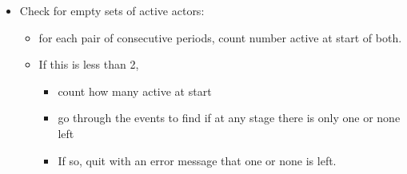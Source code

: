 \documentclass[12pt,a4paper]{article}
\renewcommand{\=}{\,=\,}
\newcommand{\+}{\,+\,}
\begin{document}
\begin{description}
\begin{itemize}
\begin{algorithmic}
\ENDIF
\ENDFOR
\ENDFOR
\ENDFOR
\end{algorithmic}
\item
Check for empty sets of active actors:
\begin{itemize}
\item for each pair of consecutive periods, count number active at start of
  both.
\item If this is less than 2,
\begin{itemize}
\item count how many active at start
\item go through the events to find if at any stage there is only one or
  none left
\item If so, quit with an error message that one or none is left.
\end{itemize}
\end{itemize}
\end{itemize}

\end{description}
\end{document}
